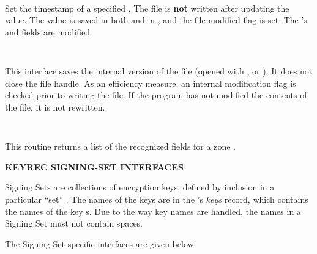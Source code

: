 \begin{description}
\item {}\verb" "

Set the timestamp of a specified .  The file is {\bf not}
written after updating the value.  The value is saved in both 
and in \var{\@keyreclines}, and the file-modified flag is set.  The
's  and  fields are
modified.

\item {}\verb" "

This interface saves the internal version of the  file (opened
with ,  or ).
It does not close the file handle.  As an efficiency measure, an internal
modification flag is checked prior to writing the file.  If the program has
not modified the contents of the  file, it is not rewritten.

\item {}\verb" "

This routine returns a list of the recognized fields for a zone
.

\end{description}

{\bf KEYREC SIGNING-SET INTERFACES}

Signing Sets are collections of encryption keys, defined by inclusion in a
particular ``set'' .  The names of the keys are in the
's {\it keys} record, which contains the names of the key
s.  Due to the way key names are handled, the names in a
Signing Set must not contain spaces.

The Signing-Set-specific interfaces are given below.

